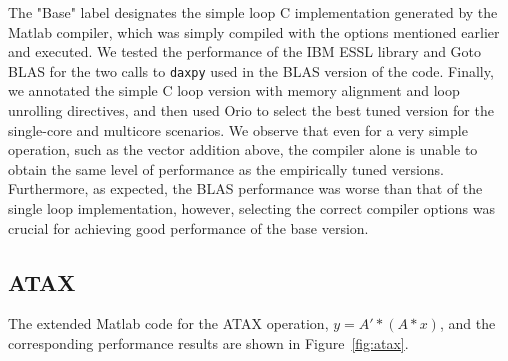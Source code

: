 \documentclass[11pt]{article}
\begin{document}
The "Base" label designates the simple loop C implementation generated by the Matlab compiler, which was simply compiled with the options mentioned earlier and executed. We tested the performance of the IBM ESSL library and Goto BLAS for the two calls to \texttt{daxpy} used in the BLAS version of the code. Finally, we annotated the simple C loop version with memory alignment and loop unrolling directives, and then used Orio to select the best tuned version for the single-core and multicore scenarios. We observe that even for a very simple operation, such as the vector addition above, the compiler alone is unable to obtain the same level of performance as the empirically tuned versions. Furthermore, as expected, the BLAS performance was worse than that of the single loop implementation, however, selecting the correct compiler options was crucial for achieving good performance of the base version.

\subsection{ATAX}


The extended Matlab code for the ATAX operation, $y = A' * (A * x)$,
and the corresponding performance results are shown in Figure~\ref{fig:atax}.
\end{document}
